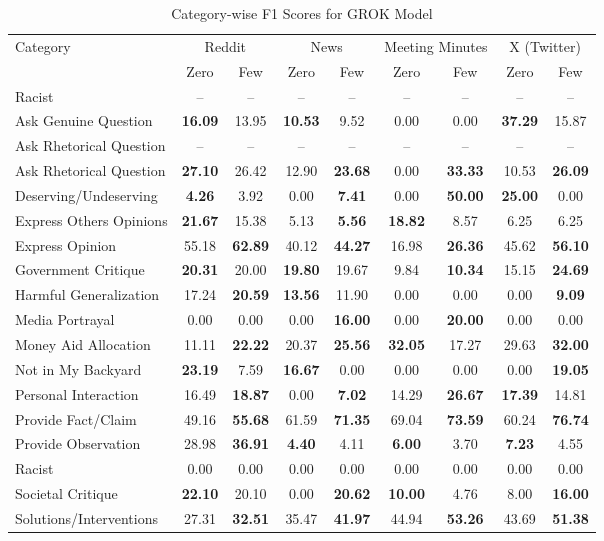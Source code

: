 \begin{table*}[htbp]
\centering
\begin{tabular}{l *{8}{c}}
\toprule
Category & \multicolumn{2}{c}{Reddit} & \multicolumn{2}{c}{News} & \multicolumn{2}{c}{Meeting Minutes} & \multicolumn{2}{c}{X (Twitter)} \\
& Zero & Few & Zero & Few & Zero & Few & Zero & Few \\
\midrule
Racist & -- & -- & -- & -- & -- & -- & -- & -- \\
Ask Genuine Question & \textbf{16.09} & 13.95 & \textbf{10.53} & 9.52 & 0.00 & 0.00 & \textbf{37.29} & 15.87 \\
Ask Rhetorical Question & -- & -- & -- & -- & -- & -- & -- & -- \\
Ask Rhetorical Question & \textbf{27.10} & 26.42 & 12.90 & \textbf{23.68} & 0.00 & \textbf{33.33} & 10.53 & \textbf{26.09} \\
Deserving/Undeserving & \textbf{4.26} & 3.92 & 0.00 & \textbf{7.41} & 0.00 & \textbf{50.00} & \textbf{25.00} & 0.00 \\
Express Others Opinions & \textbf{21.67} & 15.38 & 5.13 & \textbf{5.56} & \textbf{18.82} & 8.57 & 6.25 & 6.25 \\
Express Opinion & 55.18 & \textbf{62.89} & 40.12 & \textbf{44.27} & 16.98 & \textbf{26.36} & 45.62 & \textbf{56.10} \\
Government Critique & \textbf{20.31} & 20.00 & \textbf{19.80} & 19.67 & 9.84 & \textbf{10.34} & 15.15 & \textbf{24.69} \\
Harmful Generalization & 17.24 & \textbf{20.59} & \textbf{13.56} & 11.90 & 0.00 & 0.00 & 0.00 & \textbf{9.09} \\
Media Portrayal & 0.00 & 0.00 & 0.00 & \textbf{16.00} & 0.00 & \textbf{20.00} & 0.00 & 0.00 \\
Money Aid Allocation & 11.11 & \textbf{22.22} & 20.37 & \textbf{25.56} & \textbf{32.05} & 17.27 & 29.63 & \textbf{32.00} \\
Not in My Backyard & \textbf{23.19} & 7.59 & \textbf{16.67} & 0.00 & 0.00 & 0.00 & 0.00 & \textbf{19.05} \\
Personal Interaction & 16.49 & \textbf{18.87} & 0.00 & \textbf{7.02} & 14.29 & \textbf{26.67} & \textbf{17.39} & 14.81 \\
Provide Fact/Claim & 49.16 & \textbf{55.68} & 61.59 & \textbf{71.35} & 69.04 & \textbf{73.59} & 60.24 & \textbf{76.74} \\
Provide Observation & 28.98 & \textbf{36.91} & \textbf{4.40} & 4.11 & \textbf{6.00} & 3.70 & \textbf{7.23} & 4.55 \\
Racist & 0.00 & 0.00 & 0.00 & 0.00 & 0.00 & 0.00 & 0.00 & 0.00 \\
Societal Critique & \textbf{22.10} & 20.10 & 0.00 & \textbf{20.62} & \textbf{10.00} & 4.76 & 8.00 & \textbf{16.00} \\
Solutions/Interventions & 27.31 & \textbf{32.51} & 35.47 & \textbf{41.97} & 44.94 & \textbf{53.26} & 43.69 & \textbf{51.38} \\
\bottomrule
\end{tabular}
\centering\caption{Category-wise F1 Scores for GROK Model}
\label{tab:grok_category_breakdown}
\end{table*}